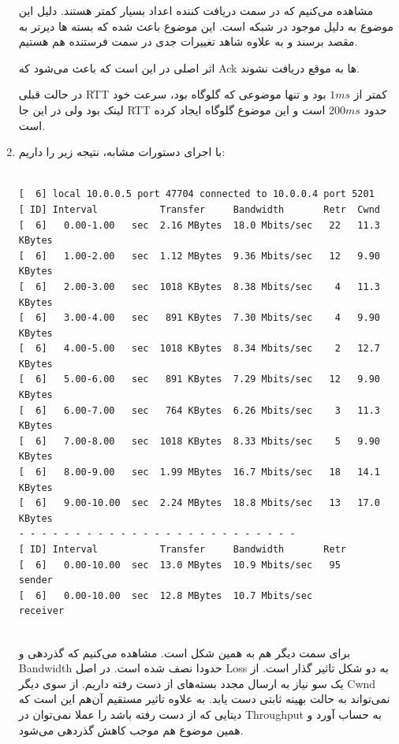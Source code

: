 \documentclass[12pt]{article}
\begin{document}
\begin{enumerate}
	مشاهده می‌کنیم که در سمت دریافت کننده اعداد  بسیار کمتر هستند. دلیل این موضوع به دلیل  موجود در شبکه است. این موضوع باعث شده که بسته ها دیرتر به مقصد برسند و به علاوه شاهد تغییرات جدی در  سمت فرستنده هم هستیم.
	
	اثر اصلی  در این است که باعث می‌شود که Ack ها به موقع دریافت نشوند.
	
	در حالت قبلی RTT کمتر از $1ms$ بود و تنها موضوعی که گلوگاه بود، سرعت خود لینک بود ولی در این جا RTT حدود $200ms$ است و این موضوع گلوگاه ایجاد کرده است.
	
	\item
	
	
	با اجرای دستورات مشابه، نتیجه زیر را داریم:
	
	\begin{latin}
		\begin{Verbatim}
			
[  6] local 10.0.0.5 port 47704 connected to 10.0.0.4 port 5201
[ ID] Interval           Transfer     Bandwidth       Retr  Cwnd
[  6]   0.00-1.00   sec  2.16 MBytes  18.0 Mbits/sec   22   11.3 KBytes       
[  6]   1.00-2.00   sec  1.12 MBytes  9.36 Mbits/sec   12   9.90 KBytes       
[  6]   2.00-3.00   sec  1018 KBytes  8.38 Mbits/sec    4   11.3 KBytes       
[  6]   3.00-4.00   sec   891 KBytes  7.30 Mbits/sec    4   9.90 KBytes       
[  6]   4.00-5.00   sec  1018 KBytes  8.34 Mbits/sec    2   12.7 KBytes       
[  6]   5.00-6.00   sec   891 KBytes  7.29 Mbits/sec   12   9.90 KBytes       
[  6]   6.00-7.00   sec   764 KBytes  6.26 Mbits/sec    3   11.3 KBytes       
[  6]   7.00-8.00   sec  1018 KBytes  8.33 Mbits/sec    5   9.90 KBytes       
[  6]   8.00-9.00   sec  1.99 MBytes  16.7 Mbits/sec   18   14.1 KBytes       
[  6]   9.00-10.00  sec  2.24 MBytes  18.8 Mbits/sec   13   17.0 KBytes       
- - - - - - - - - - - - - - - - - - - - - - - - -
[ ID] Interval           Transfer     Bandwidth       Retr
[  6]   0.00-10.00  sec  13.0 MBytes  10.9 Mbits/sec   95             sender
[  6]   0.00-10.00  sec  12.8 MBytes  10.7 Mbits/sec                  receiver


		\end{Verbatim}
	\end{latin}
	
	
	برای سمت دیگر هم به همین شکل است. مشاهده‌ می‌کنیم که گذردهی و Bandwidth حدودا نصف شده است. 
	در اصل Loss به دو شکل تاثیر گذار است. از یک سو نیاز به ارسال مجدد بسته‌های از دست رفته داریم. از سوی دیگر Cwnd نمی‌تواند به حالت بهینه ثابتی دست یابد. به علاوه تاثیر مستقیم آن‌هم این است که دیتایی که از دست رفته باشد را عملا نمی‌توان در Throughput به حساب آورد و همین موضوع هم موجب کاهش گذردهی می‌شود.
	

\end{enumerate}
\end{document}

